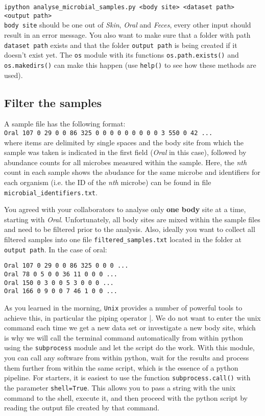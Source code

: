 \documentclass[12pt]{article}
\begin{document}
\noindent\verb|ipython analyse_microbial_samples.py <body site> <dataset path>|\\
\verb|<output path>|\\

\texttt{body site} should be one out of \emph{Skin}, \emph{Oral} and \emph{Feces}, every other input should result in an error message. You also want to make sure that a folder with path \texttt{dataset path} exists and that the folder \texttt{output path} is being created if it doesn't exist yet. The \texttt{os} module with its functions \texttt{os.path.exists()}  and \texttt{os.makedirs()} can make this happen (use \texttt{help()} to see how these methods are used).

\subsection{Filter the samples}

A sample file has the following format:\\

\verb|Oral 107 0 29 0 0 86 325 0 0 0 0 0 0 0 0 0 3 550 0 42 ... |\\

where items are delimited by single spaces and the body site from which the sample was taken is indicated in the first field (\emph{Oral} in this case), followed by abundance counts for all microbes measured within the sample. Here, the \emph{nth} count in each sample shows the abudance for the same microbe and identifiers for each organism (i.e. the ID of the \emph{nth} microbe) can be found in file
 \texttt{microbial\_identifiers.txt}.

You agreed with your collaborators to analyse only \textbf{one body} site at a time, starting with \emph{Oral}. Unfortunately, all body sites are mixed within the sample files and need to be filtered prior to the analysis. Also, ideally you want to collect all filtered samples into one file \texttt{filtered\_samples.txt} located in the folder at \texttt{output path}. In the case of oral: 

\begin{verbatim}
Oral 107 0 29 0 0 86 325 0 0 0 ...
Oral 78 0 5 0 0 36 11 0 0 0 ...
Oral 150 0 3 0 0 5 3 0 0 0 ...
Oral 166 0 9 0 0 7 46 1 0 0 ...
\end{verbatim}

As you learned in the morning, \texttt{Unix} provides a number of powerful tools to achieve this, in particular the piping operator |. We do not want to enter the unix command each time we get a new data set or investigate a new body site, which is why we will call the terminal command automatically from within python using the \texttt{subprocess} module and let the script do the work. With this module, you can call any software from within python, wait for the results and process them further from within the same script, which is the essence of a python pipeline. For starters, it is easiest to use the function \texttt{subprocess.call()} with the parameter \texttt{shell=True}. This allows you to pass a string with the unix command to the shell, execute it, and then proceed with the python script by reading the output file created by that command.\\
\end{document}
